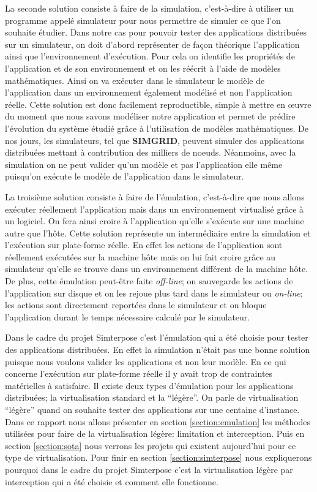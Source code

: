 La seconde solution consiste à faire de la simulation, c'est-à-dire à utiliser un programme appelé simulateur pour nous permettre de simuler ce que l'on souhaite étudier. Dans notre cas pour pouvoir tester des applications distribuées sur un simulateur, on doit d'abord représenter de façon théorique l'application ainsi que l'environnement d'exécution. Pour cela on identifie les propriétés de l'application et de son environnement et on les réécrit à l'aide de modèles mathématiques. Ainsi on va exécuter dans le simulateur le modèle de l'application dans un environnement également modélisé et non l'application réelle. Cette solution est donc facilement reproductible, simple à mettre en \oe uvre du moment que nous savons modéliser notre application et permet de prédire l'évolution du système étudié grâce à l'utilisation de modèles mathématiques. De nos jours, les simulateurs, tel que  \textbf{SIMGRID}\cite{SIMULATION:CASANOVA, SIMULATION:MARTIN}, peuvent simuler des applications distribuées mettant à contribution des milliers de noeuds. Néanmoins, avec la simulation on ne peut valider qu'un modèle et pas l'application elle même puisqu'on exécute le modèle de l'application dans le simulateur. 

La troisième solution consiste à faire de l'émulation, c'est-à-dire que nous allons exécuter réellement l'application mais dans un environnement virtualisé grâce à un logiciel. On fera ainsi croire à l'application qu'elle s'exécute sur une machine autre que l'hôte. Cette solution représente un intermédiaire entre la simulation et l'exécution sur plate-forme réelle. En effet les actions de l'application sont réellement exécutées sur la machine hôte mais on lui fait croire grâce au simulateur qu'elle se trouve dans un environnement différent de la machine hôte. De plus, cette émulation peut-être faite \textit{off-line}; on sauvegarde les actions de l'application sur disque et on les rejoue plus tard dans le simulateur ou \textit{on-line}; les actions sont directement reportées dans le simulateur et on bloque l'application durant le temps nécessaire calculé par le simulateur.

Dans le cadre du projet Simterpose c'est l'émulation qui a été choisie pour tester des applications distribuées. En effet la simulation n'était pas une bonne solution puisque nous voulons valider les applications et non leur modèle. En ce qui concerne l'exécution sur plate-forme réelle il y avait trop de contraintes matérielles à satisfaire. Il existe deux types d'émulation pour les applications distribuées; la virtualisation standard et la ``légère''. On parle de virtualisation ``légère'' quand on souhaite tester des applications sur une centaine d'instance. Dans ce rapport nous allons présenter en section \ref{section:emulation} les méthodes utilisées pour faire de la virtualisation légère: limitation et interception. Puis en section \ref{section:sota} nous verrons les projets qui existent aujourd'hui pour ce type de virtualisation. Pour finir en section \ref{section:simterpose} nous expliquerons pourquoi dans le cadre du projet Simterpose c'est la virtualisation légère par interception qui a été choisie et comment elle fonctionne.


